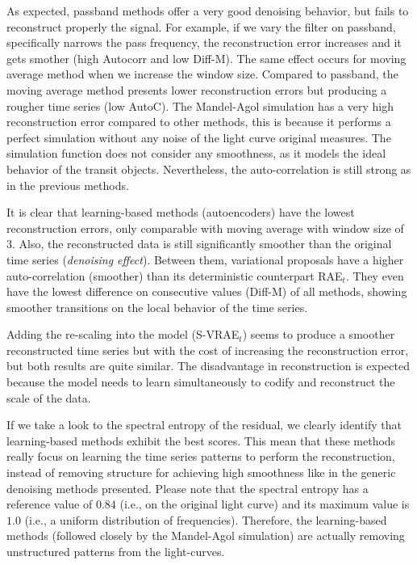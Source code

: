 As expected, passband methods offer a very good denoising behavior, but fails to reconstruct properly the signal. For example, if we vary the filter on passband, specifically narrows the pass frequency, the reconstruction error increases and it gets smother (high Autocorr and low Diff-M). 
The same effect occurs for moving average method when we increase the window size. Compared to passband, the moving average method presents lower reconstruction errors but producing a rougher time series (low AutoC).
The Mandel-Agol simulation has a very high reconstruction error compared to other methods, this is because it performs a perfect simulation without any noise of the light curve original measures. The simulation function does not consider any smoothness, as it models the ideal behavior of the transit objects. Nevertheless, the auto-correlation is still strong as in the previous methods.

It is clear that learning-based methods (autoencoders) have the lowest reconstruction errors, only comparable with moving average with window size of 3. Also, the reconstructed data is still significantly smoother than the original time series (\textit{denoising effect}). Between them, variational proposals have a higher auto-correlation (smoother) than its deterministic counterpart RAE$_t$. They even have the lowest difference on consecutive values (Diff-M) of all methods, showing smoother transitions on the local behavior of the time series. 

Adding the re-scaling into the model (S-VRAE$_t$) seems to produce a smoother reconstructed time series but with the cost of increasing the reconstruction error, but both results are quite similar. The disadvantage in reconstruction is expected because the model needs to learn simultaneously to codify and reconstruct the scale of the data.

If we take a look to the spectral entropy of the residual, we clearly identify that learning-based methods exhibit the best scores. This mean that these methods really focus on learning the time series patterns to perform the reconstruction, instead of removing structure for achieving high smoothness like in the generic denoising methods presented.  %
Please note that the spectral entropy has a reference value of $0.84$ (i.e., on the original light curve) and its maximum value is $1.0$ (i.e., a uniform distribution of frequencies). Therefore, the learning-based methods (followed closely by the Mandel-Agol simulation) are actually removing unstructured patterns from the light-curves.

